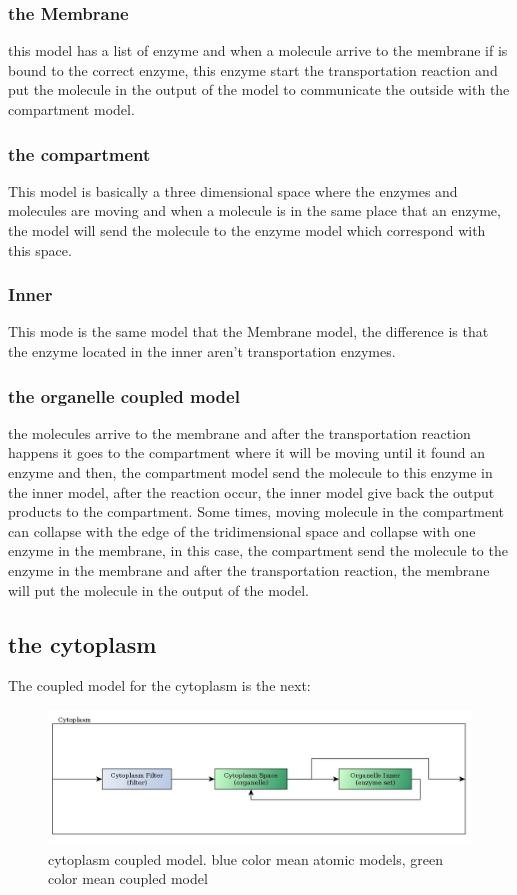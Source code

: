 \documentclass[12pt]{article}
\begin{document}
\subsubsection*{the Membrane}
this model has a list of enzyme and when a molecule arrive to the membrane if is bound to the correct enzyme, this enzyme start the transportation reaction and put the molecule in the output of the model to communicate the outside with the compartment model.

\subsubsection*{the compartment}
This model is basically a three dimensional space where the enzymes and molecules are moving and when a molecule is in the same place that an enzyme, the model will send the molecule to the enzyme model which correspond with this space.

\subsubsection*{Inner}
This mode is the same model that the Membrane model, the difference is that the enzyme located in the inner aren't transportation enzymes.

\subsubsection*{the organelle coupled model}
the molecules arrive to the membrane and after the transportation reaction happens it goes to the compartment where it will be moving until it found an enzyme and then, the compartment model send the molecule to this enzyme in the inner model, after the reaction occur, the inner model give back the output products to the compartment. Some times, moving molecule in the compartment can collapse with the edge of the tridimensional space and collapse with one enzyme in the membrane, in this case, the compartment send the molecule to the enzyme in the membrane and after the transportation reaction, the membrane will put the molecule in the output of the model.

\subsection*{the cytoplasm}
The coupled model for the cytoplasm is the next:

\begin{figure}[h!]
 \centering
  \includegraphics[width=1\textwidth]{coupled-cytoplasm.jpg}
 \caption{cytoplasm coupled model. blue color mean atomic models, green color mean coupled model}
\end{figure}
\end{document}
